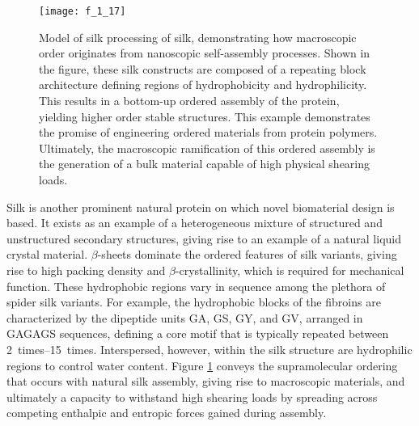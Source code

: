 \begin{refsection}
\begin{figure}[h!] \centering \texttt{[image: f\_1\_17]}
\caption[Model of silk processing of  silk, demonstrating how
    macroscopic order originates from nanoscopic self-assembly processes.  Shown
    in the figure, these silk constructs are composed of a repeating block
    architecture defining regions of hydrophobicity and hydrophilicity. This
    results in a bottom-up ordered assembly of the protein, yielding higher
    order stable structures. This example demonstrates the promise of
    engineering ordered materials from protein polymers. Ultimately, the
macroscopic ramification of this ordered assembly is the generation of a bulk
material capable of high physical shearing loads.]
{Model of silk processing of  silk, demonstrating how macroscopic
order originates from nanoscopic self-assembly processes. Shown in the figure,
these silk constructs are composed of a repeating block architecture defining
regions of hydrophobicity and hydrophilicity. This results in a bottom-up
ordered assembly of the protein, yielding higher order stable structures. This
example demonstrates the promise of engineering ordered materials from protein
polymers. Ultimately, the macroscopic ramification of this ordered assembly is
the generation of a bulk material capable of high physical shearing
loads.\cite{Jin2003}}
\label{fig:silk_structure}
\end{figure}
Silk is another prominent natural protein on which novel biomaterial design is
based. It exists as an example of a heterogeneous mixture of structured and
unstructured secondary structures, giving rise to an example of a natural liquid
crystal material. $\beta$-sheets dominate the ordered features of silk variants,
giving rise to high packing density and ${\beta}$-crystallinity, which is
required for mechanical function. These hydrophobic regions vary in sequence
among the plethora of spider silk variants. For example, the hydrophobic blocks
of the  fibroins are characterized by the dipeptide units GA, GS,
GY, and GV, arranged in GAGAGS sequences, defining a core motif that is
typically repeated between \SIrange{2}{15}{times}. Interspersed, however, within
the silk structure are hydrophilic regions to control water
content.\cite{Bini2004a,Jin2003,Knight2002} Figure \ref{fig:silk_structure}
conveys the supramolecular ordering that occurs with natural silk assembly,
giving rise to macroscopic materials, and ultimately a capacity to withstand
high shearing loads by spreading across competing enthalpic and entropic forces
gained during assembly.


\end{refsection}
